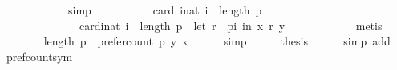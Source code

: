 \begin{isabellebody}
\ \ \ \ \isamarkupfalse%
\ {\isachardoublequoteopen}{}{}{\isachardoublequoteclose}\isanewline
\ \ \ \ \isamarkupfalse%
\ simp\isanewline
\ \ \isamarkupfalse%
\ \isamarkupfalse%
\isanewline
\ \ \ \ {\isachardoublequoteopen}{\isachardot}{\kern0pt}{\isachardot}{\kern0pt}{\isachardot}{\kern0pt}\ {\isacharequal}{\kern0pt}\ {\isacharparenleft}{\kern0pt}card\ {\isacharbraceleft}{\kern0pt}i{\isacharcolon}{\kern0pt}{\isacharcolon}{\kern0pt}nat{\isachardot}{\kern0pt}\ i\ {\isacharless}{\kern0pt}\ length\ p{\isacharbraceright}{\kern0pt}{\isacharparenright}{\kern0pt}\ {\isacharminus}{\kern0pt}\isanewline
\ \ \ \ \ \ \ \ \ \ \ \ \ \ card{\isacharparenleft}{\kern0pt}{\isacharbraceleft}{\kern0pt}i{\isacharcolon}{\kern0pt}{\isacharcolon}{\kern0pt}nat{\isachardot}{\kern0pt}\ i\ {\isacharless}{\kern0pt}\ length\ p\ {\isasymand}\ {\isacharparenleft}{\kern0pt}let\ r\ {\isacharequal}{\kern0pt}\ {\isacharparenleft}{\kern0pt}p{\isacharbang}{\kern0pt}i{\isacharparenright}{\kern0pt}\ in\ {\isacharparenleft}{\kern0pt}x\ {\isasympreceq}\isactrlsub r\ y{\isacharparenright}{\kern0pt}{\isacharparenright}{\kern0pt}{\isacharbraceright}{\kern0pt}{\isacharparenright}{\kern0pt}{\isachardoublequoteclose}\isanewline
\ \ \ \ \isamarkupfalse%
\ {\isachardoublequoteopen}{}{}{\isachardoublequoteclose}\isanewline
\ \ \ \ \isamarkupfalse%
\ metis\isanewline
\ \ \isamarkupfalse%
\ \isamarkupfalse%
\isanewline
\ \ \ \ {\isachardoublequoteopen}{\isachardot}{\kern0pt}{\isachardot}{\kern0pt}{\isachardot}{\kern0pt}\ {\isacharequal}{\kern0pt}\ length\ p\ {\isacharminus}{\kern0pt}\ {\isacharparenleft}{\kern0pt}prefer{\isacharunderscore}{\kern0pt}count\ p\ y\ x{\isacharparenright}{\kern0pt}{\isachardoublequoteclose}\isanewline
\ \ \ \ \isamarkupfalse%
\ simp\isanewline
\ \ \isamarkupfalse%
\ \isamarkupfalse%
\ {\isacharquery}{\kern0pt}thesis\isanewline
\ \ \ \ \isamarkupfalse%
\ {\isacharparenleft}{\kern0pt}simp\ add{\isacharcolon}{\kern0pt}\ {\isachardoublequoteopen}{}{}{\isachardoublequoteclose}\ {\isachardoublequoteopen}{}{}{\isachardoublequoteclose}{\isacharparenright}{\kern0pt}\isanewline
{}\isamarkupfalse%
%
\endisatagproof
{\isafoldproof}%
%
\isadelimproof
\isanewline
%
\endisadelimproof
\isanewline
{}\isamarkupfalse%
\ pref{\isacharunderscore}{\kern0pt}count{\isacharunderscore}{\kern0pt}sym{\isacharcolon}{\kern0pt}\isanewline

\end{isabellebody}
